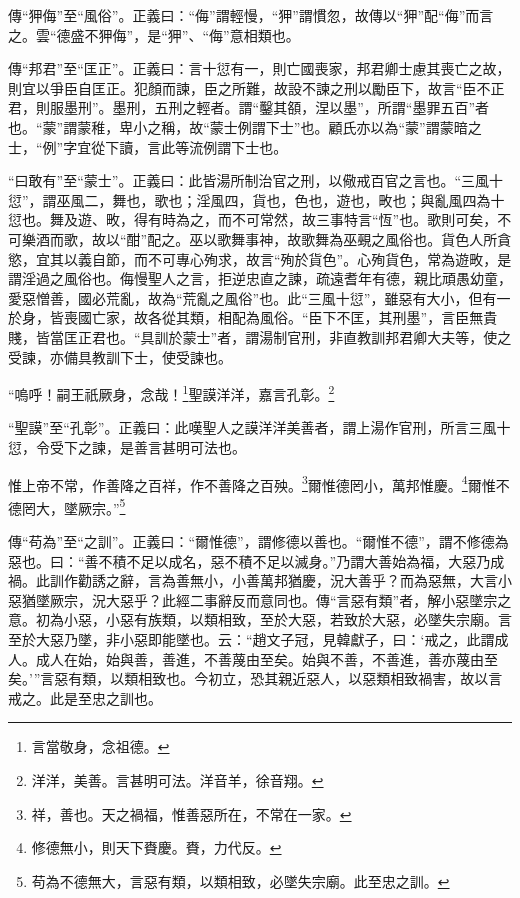{\noindent\zhuan{}\fzbyks 傳“狎侮”至“風俗”。正義曰：“侮”謂輕慢，“狎”謂慣忽，故傳以“狎”配“侮”而言之。雲“德盛不狎侮”，是“狎”、“侮”意相類也。 \par}

{\noindent\zhuan{}\fzbyks 傳“邦君”至“匡正”。正義曰：言十愆有一，則亡國喪家，邦君卿士慮其喪亡之故，則宜以爭臣自匡正。犯顏而諫，臣之所難，故設不諫之刑以勵臣下，故言“臣不正君，則服墨刑”。墨刑，五刑之輕者。謂“鑿其頟，涅以墨”，所謂“墨罪五百”者也。“蒙”謂蒙稚，卑小之稱，故“蒙士例謂下士”也。顧氏亦以為“蒙”謂蒙暗之士，“例”字宜從下讀，言此等流例謂下士也。 \par}

{\noindent\shu{}\fzkt “曰敢有”至“蒙士”。正義曰：此皆湯所制治官之刑，以儆戒百官之言也。“三風十愆”，謂巫風二，舞也，歌也；淫風四，貨也，色也，遊也，畋也；與亂風四為十愆也。舞及遊、畋，得有時為之，而不可常然，故三事特言“恆”也。歌則可矣，不可樂酒而歌，故以“酣”配之。巫以歌舞事神，故歌舞為巫覡之風俗也。貨色人所貪慾，宜其以義自節，而不可專心殉求，故言“殉於貨色”。心殉貨色，常為遊畋，是謂淫過之風俗也。侮慢聖人之言，拒逆忠直之諫，疏遠耆年有德，親比頑愚幼童，愛惡憎善，國必荒亂，故為“荒亂之風俗”也。此“三風十愆”，雖惡有大小，但有一於身，皆喪國亡家，故各從其類，相配為風俗。“臣下不匡，其刑墨”，言臣無貴賤，皆當匡正君也。“具訓於蒙士”者，謂湯制官刑，非直教訓邦君卿大夫等，使之受諫，亦備具教訓下士，使受諫也。 \par}

“嗚呼！嗣王祇厥身，念哉！\footnote{言當敬身，念祖德。}聖謨洋洋，嘉言孔彰。\footnote{洋洋，美善。言甚明可法。洋音羊，徐音翔。}

{\noindent\shu{}\fzkt “聖謨”至“孔彰”。正義曰：此嘆聖人之謨洋洋美善者，謂上湯作官刑，所言三風十愆，令受下之諫，是善言甚明可法也。 \par}

惟上帝不常，作善降之百祥，作不善降之百殃。\footnote{祥，善也。天之禍福，惟善惡所在，不常在一家。}爾惟德罔小，萬邦惟慶。\footnote{修德無小，則天下賚慶。賚，力代反。}爾惟不德罔大，墜厥宗。”\footnote{苟為不德無大，言惡有類，以類相致，必墜失宗廟。此至忠之訓。}


{\noindent\zhuan{}\fzbyks 傳“苟為”至“之訓”。正義曰：“爾惟德”，謂修德以善也。“爾惟不德”，謂不修德為惡也。曰：“善不積不足以成名，惡不積不足以滅身。”乃謂大善始為福，大惡乃成禍。此訓作勸誘之辭，言為善無小，小善萬邦猶慶，況大善乎？而為惡無，大言小惡猶墜厥宗，況大惡乎？此經二事辭反而意同也。傳“言惡有類”者，解小惡墜宗之意。初為小惡，小惡有族類，以類相致，至於大惡，若致於大惡，必墜失宗廟。言至於大惡乃墜，非小惡即能墜也。云：“趙文子冠，見韓獻子，曰：‘戒之，此謂成人。成人在始，始與善，善進，不善蔑由至矣。始與不善，不善進，善亦蔑由至矣。’”言惡有類，以類相致也。今初立，恐其親近惡人，以惡類相致禍害，故以言戒之。此是至忠之訓也。 \par}

